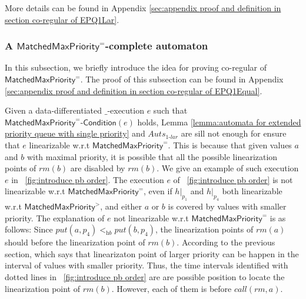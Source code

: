 More details can be found in Appendix \ref{sec:appendix proof and definition in section co-regular of EPQ1Lar}. %


\subsubsection{A $\mathsf{MatchedMaxPriority}^=$-complete automaton}
\label{subsec:co-regular of EPQ1Equal}

In this subsection, we briefly introduce the idea for proving co-regular of $\mathsf{MatchedMaxPriority}^{=}$. The proof of this subsection can be found in Appendix \ref{sec:appendix proof and definition in section co-regular of EPQ1Equal}.

Given a data-differentiated $\_$-execution $e$ such that $\mathsf{MatchedMaxPriority}^{=}\mathsf{\text{-}Condition}(e)$ holds, Lemma \ref{lemma:automata for extended priority queue with single priority} and $\textit{Auts}_{\textit{1-lar}}$ are sill not enough for ensure that $e$ linearizable w.r.t $\mathsf{MatchedMaxPriority}^{=}$. This is because that given values $a$ and $b$ with maximal priority, it is possible that all the possible linearization points of $\textit{rm}(b)$ are disabled by $\textit{rm}(b)$. We give an example of such execution $e$ in \figurename~\ref{fig:introduce pb order}. The execution $e$ of \figurename~\ref{fig:introduce pb order} is not linearizable w.r.t $\mathsf{MatchedMaxPriority}^{=}$, even if $h \vert_{p_1}$ and $h \vert_{p_4}$ both linearizable w.r.t $\mathsf{MatchedMaxPriority}^{>}$, and either $a$ or $b$ is covered by values with smaller priority. The explanation of $e$ not linearizable w.r.t $\mathsf{MatchedMaxPriority}^{=}$ is as follows: Since $\textit{put}(a,p_4) <_{\textit{hb}} \textit{put}(b,p_4)$, the linearization points of $\textit{rm}(a)$ should before the linearization point of $\textit{rm}(b)$. According to the previous section, which says that linearizaton point of larger priority can be happen in the interval of values with smaller priority. Thus, the time intervals identified with dotted lines in \figurename~\ref{fig:introduce pb order} are are possible position to locate the linearization point of $\textit{rm}(b)$. However, each of them is before $\textit{call}(\textit{rm},a)$.


